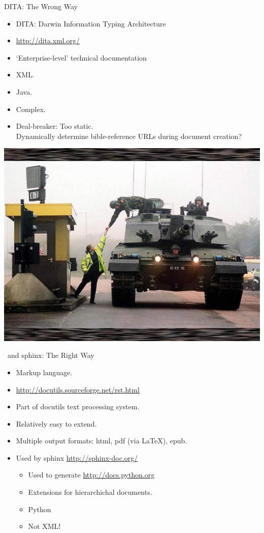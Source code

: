 \documentclass{beamer}
\begin{document}
    
\begin{frame}{DITA: The Wrong Way}
    \begin{itemize}
    \item DITA: Darwin Information Typing Architecture
    \item \url{http://dita.xml.org/}
    \item `Enterprise-level' technical documentation
    \item XML.
    \item Java.
    \item Complex.
    \item Deal-breaker: Too static.\\
        Dynamically determine bible-reference URLs during document creation?
    \end{itemize}
\end{frame}

\begin{frame}[plain]
    \centerline{\includegraphics[keepaspectratio=true, width=\paperwidth]{tank-toll.jpg}}
\end{frame}

\begin{frame}{\rst\ and sphinx: The Right Way}
\begin{itemize}
\item Markup language.
\item \url{http://docutils.sourceforge.net/rst.html}
\item Part of docutils text processing system.
\item Relatively easy to extend.
\item Multiple output formats: html, pdf (via \LaTeX), epub.
\item Used by sphinx \url{http://sphinx-doc.org/}
\begin{itemize}
\item Used to generate \url{http://docs.python.org}
\item Extensions for hierarchichal documents.
\item Python
\item Not XML!
\end{itemize}
\end{itemize}
\end{frame}
\end{document}
